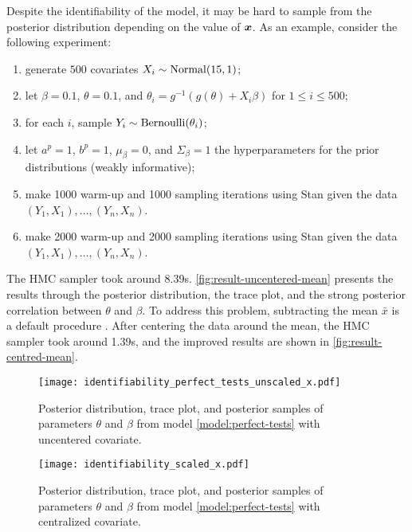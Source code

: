Despite the identifiability of the model, it may be hard to sample from
the posterior distribution depending on the value of $\boldsymbol{x}$. As an example,
consider the following experiment:

\begin{enumerate}[label=(\roman*)]
  \item generate $500$ covariates $X_i \sim \operatorname{Normal}(15, 1)$;
  \item let $\beta = 0.1$, $\theta = 0.1$, and $\theta_i = g^{-1}(g(\theta) +
          X_i\beta)$ for $1 \le i \le 500$;
  \item for each $i$, sample $Y_i \sim \operatorname{Bernoulli}(\theta_i)$;
  \item let $a^p = 1$, $b^p = 1$, $\mu_{\beta} = 0$, and $\Sigma_{\beta} = 1$
        the hyperparameters for the prior distributions (weakly informative);
  \item make 1000 warm-up and 1000 sampling iterations using Stan given the
        data $(Y_1, X_1), \dots, (Y_n, X_n)$.
  \item make 2000 warm-up and 2000 sampling iterations using Stan given the
        data $(Y_1, X_1), \dots, (Y_n, X_n)$.
\end{enumerate}

The HMC sampler took around 8.39s.
\autoref{fig:result-uncentered-mean} presents the results through the posterior
distribution, the trace plot, and the strong posterior
correlation between $\theta$ and $\beta$. To address this
problem, subtracting the mean $\bar{x}$ is a default procedure \cite[p.
  5]{ogle2020ensuring}. After centering the data around the mean, the HMC
sampler took around 1.39s, and the improved results are shown in
\autoref{fig:result-centred-mean}.

\begin{figure}
  \centering
  \caption{\label{fig:result-uncentered-mean}Posterior
    distribution, trace plot, and posterior samples of parameters
    $\theta$ and $\beta$ from model \eqref{model:perfect-tests} with uncentered covariate.}
  \texttt{[image: identifiability\_perfect\_tests\_unscaled\_x.pdf]}
\end{figure}

\begin{figure}
  \centering
  \caption{\label{fig:result-centred-mean}Posterior
    distribution, trace plot, and posterior samples of parameters
    $\theta$ and $\beta$ from model \eqref{model:perfect-tests} with centralized covariate.}
  \texttt{[image: identifiability\_scaled\_x.pdf]}
\end{figure}

